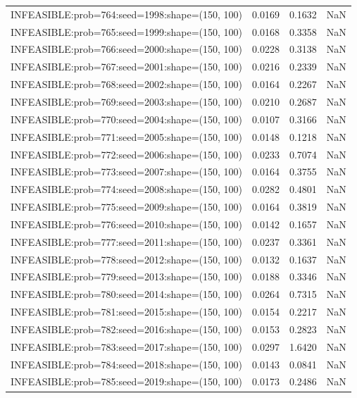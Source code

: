 \begin{longtable}{lccc}
INFEASIBLE:prob=764:seed=1998:shape=(150, 100) &   0.0169 &  0.1632 &    NaN \\
INFEASIBLE:prob=765:seed=1999:shape=(150, 100) &   0.0168 &  0.3358 &    NaN \\
INFEASIBLE:prob=766:seed=2000:shape=(150, 100) &   0.0228 &  0.3138 &    NaN \\
INFEASIBLE:prob=767:seed=2001:shape=(150, 100) &   0.0216 &  0.2339 &    NaN \\
INFEASIBLE:prob=768:seed=2002:shape=(150, 100) &   0.0164 &  0.2267 &    NaN \\
INFEASIBLE:prob=769:seed=2003:shape=(150, 100) &   0.0210 &  0.2687 &    NaN \\
INFEASIBLE:prob=770:seed=2004:shape=(150, 100) &   0.0107 &  0.3166 &    NaN \\
INFEASIBLE:prob=771:seed=2005:shape=(150, 100) &   0.0148 &  0.1218 &    NaN \\
INFEASIBLE:prob=772:seed=2006:shape=(150, 100) &   0.0233 &  0.7074 &    NaN \\
INFEASIBLE:prob=773:seed=2007:shape=(150, 100) &   0.0164 &  0.3755 &    NaN \\
INFEASIBLE:prob=774:seed=2008:shape=(150, 100) &   0.0282 &  0.4801 &    NaN \\
INFEASIBLE:prob=775:seed=2009:shape=(150, 100) &   0.0164 &  0.3819 &    NaN \\
INFEASIBLE:prob=776:seed=2010:shape=(150, 100) &   0.0142 &  0.1657 &    NaN \\
INFEASIBLE:prob=777:seed=2011:shape=(150, 100) &   0.0237 &  0.3361 &    NaN \\
INFEASIBLE:prob=778:seed=2012:shape=(150, 100) &   0.0132 &  0.1637 &    NaN \\
INFEASIBLE:prob=779:seed=2013:shape=(150, 100) &   0.0188 &  0.3346 &    NaN \\
INFEASIBLE:prob=780:seed=2014:shape=(150, 100) &   0.0264 &  0.7315 &    NaN \\
INFEASIBLE:prob=781:seed=2015:shape=(150, 100) &   0.0154 &  0.2217 &    NaN \\
INFEASIBLE:prob=782:seed=2016:shape=(150, 100) &   0.0153 &  0.2823 &    NaN \\
INFEASIBLE:prob=783:seed=2017:shape=(150, 100) &   0.0297 &  1.6420 &    NaN \\
INFEASIBLE:prob=784:seed=2018:shape=(150, 100) &   0.0143 &  0.0841 &    NaN \\
INFEASIBLE:prob=785:seed=2019:shape=(150, 100) &   0.0173 &  0.2486 &    NaN \\

\end{longtable}

